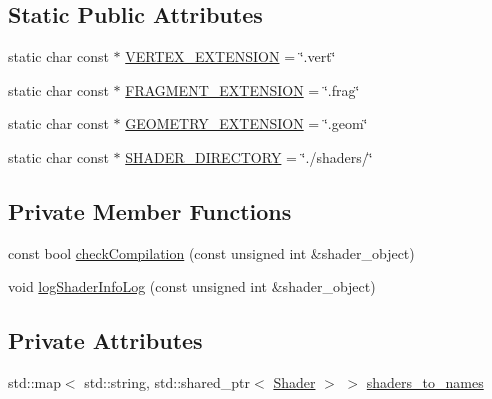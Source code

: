 \subsection*{Static Public Attributes}
\begin{DoxyCompactItemize}
\item 
static char const $\ast$ \hyperlink{class_graphics_1_1_shader_manager_abb954de5b5b6bc56d568e20b478f0712}{V\+E\+R\+T\+E\+X\+\_\+\+E\+X\+T\+E\+N\+S\+I\+O\+N} = \char`\"{}.vert\char`\"{}
\item 
static char const $\ast$ \hyperlink{class_graphics_1_1_shader_manager_aa3ad06b558229fe4d4d4ebbabfe9ca48}{F\+R\+A\+G\+M\+E\+N\+T\+\_\+\+E\+X\+T\+E\+N\+S\+I\+O\+N} = \char`\"{}.frag\char`\"{}
\item 
static char const $\ast$ \hyperlink{class_graphics_1_1_shader_manager_a66cf54024f2f1e51db6f5afccbcba67e}{G\+E\+O\+M\+E\+T\+R\+Y\+\_\+\+E\+X\+T\+E\+N\+S\+I\+O\+N} = \char`\"{}.geom\char`\"{}
\item 
static char const $\ast$ \hyperlink{class_graphics_1_1_shader_manager_ad3cef3602a2a0205064bdff0ac9437a8}{S\+H\+A\+D\+E\+R\+\_\+\+D\+I\+R\+E\+C\+T\+O\+R\+Y} = \char`\"{}./shaders/\char`\"{}
\end{DoxyCompactItemize}
\subsection*{Private Member Functions}
\begin{DoxyCompactItemize}
\item 
const bool \hyperlink{class_graphics_1_1_shader_manager_a7c73d370e436f69ee340a0f2b02558fc}{check\+Compilation} (const unsigned int \&shader\+\_\+object)
\item 
void \hyperlink{class_graphics_1_1_shader_manager_a2477b4ccc2227086b2759dc95c55005a}{log\+Shader\+Info\+Log} (const unsigned int \&shader\+\_\+object)
\end{DoxyCompactItemize}
\subsection*{Private Attributes}
\begin{DoxyCompactItemize}
\item 
std\+::map$<$ std\+::string, std\+::shared\+\_\+ptr$<$ \hyperlink{class_graphics_1_1_shader}{Shader} $>$ $>$ \hyperlink{class_graphics_1_1_shader_manager_a5cada9e001d0b2ead2bfb7a0ef37be66}{shaders\+\_\+to\+\_\+names}
\end{DoxyCompactItemize}


